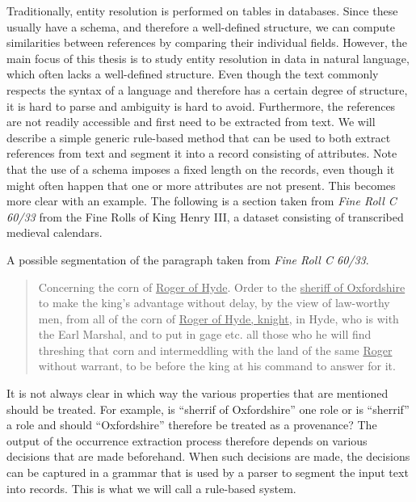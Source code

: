 Traditionally, entity resolution is performed on tables in databases.
Since these usually have a schema, and therefore a well-defined structure, we can compute similarities between references by comparing their individual fields.
However, the main focus of this thesis is to study entity resolution in data in natural language, which often lacks a well-defined structure.
Even though the text commonly respects the syntax of a language and therefore has a certain degree of structure, it is hard to parse and ambiguity is hard to avoid.
Furthermore, the references are not readily accessible and first need to be extracted from text.
We will describe a simple generic rule-based method that can be used to both extract references from text and segment it into a record consisting of attributes.
Note that the use of a schema imposes a fixed length on the records, even though it might often happen that one or more attributes are not present.
This becomes more clear with an example.
The following is a section taken from \emph{Fine Roll C 60/33}\citep{FineRolls} from the Fine Rolls of King Henry III, a dataset consisting of transcribed medieval calendars.

\begin{table}
	\centering
	
	\caption{A possible segmentation of the paragraph taken from \emph{Fine Roll C 60/33}.}
	\label{tab:segmentation}
\end{table}

\begin{quote}
	Concerning the corn of \ul{Roger of Hyde}. Order to the \ul{sheriff of Oxfordshire} to make the king’s advantage without delay, by the view of law-worthy men, from all of the corn of \ul{Roger of Hyde, knight}, in Hyde, who is with the Earl Marshal, and to put in gage etc. all those who he will find threshing that corn and intermeddling with the land of the same \ul{Roger} without warrant, to be before the king at his command to answer for it.
\end{quote}

\noindent It is not always clear in which way the various properties that are mentioned should be treated.
For example, is ``sherrif of Oxfordshire'' one role or is ``sherrif'' a role and should ``Oxfordshire'' therefore be treated as a provenance?
The output of the occurrence extraction process therefore depends on various decisions that are made beforehand.
When such decisions are made, the decisions can be captured in a grammar that is used by a parser to segment the input text into records.
This is what we will call a rule-based system.

